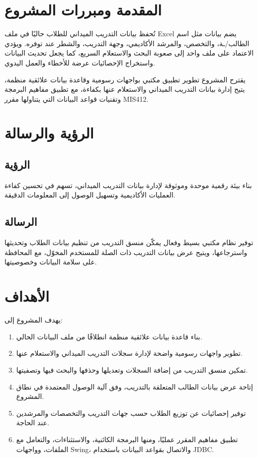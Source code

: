 \documentclass[12pt,a4paper]{article}
\begin{document}
\section{المقدمة ومبررات المشروع}
تُحفظ بيانات التدريب الميداني للطلاب حاليًا في ملف Excel يضم بيانات مثل اسم الطالب/ـة، والتخصص، والمرشد الأكاديمي، وجهة التدريب، والشطر عند توفره. ويؤدي الاعتماد على ملف واحد إلى صعوبة البحث والاستعلام السريع، كما يجعل تحديث البيانات واستخراج الإحصائيات عرضة للأخطاء والعمل اليدوي.

يقترح المشروع تطوير تطبيق مكتبي بواجهات رسومية وقاعدة بيانات علائقية منظمة، يتيح إدارة بيانات التدريب الميداني والاستعلام عنها بكفاءة، مع تطبيق مفاهيم البرمجة وتقنيات قواعد البيانات التي يتناولها مقرر MIS412.

\section{الرؤية والرسالة}
\subsection{الرؤية}
بناء بيئة رقمية موحدة وموثوقة لإدارة بيانات التدريب الميداني، تسهم في تحسين كفاءة العمليات الأكاديمية وتسهيل الوصول إلى المعلومات الدقيقة.

\subsection{الرسالة}
توفير نظام مكتبي بسيط وفعال يمكّن منسق التدريب من تنظيم بيانات الطلاب وتحديثها واسترجاعها، ويتيح عرض بيانات التدريب ذات الصلة للمستخدم المخوّل، مع المحافظة على سلامة البيانات وخصوصيتها.

\section{الأهداف}
يهدف المشروع إلى:
\begin{enumerate}
\item بناء قاعدة بيانات علائقية منظمة انطلاقًا من ملف البيانات الحالي.
\item تطوير واجهات رسومية واضحة لإدارة سجلات التدريب الميداني والاستعلام عنها.
\item تمكين منسق التدريب من إضافة السجلات وتعديلها وحذفها والبحث فيها وتصفيتها.
\item إتاحة عرض بيانات الطالب المتعلقة بالتدريب، وفق آلية الوصول المعتمدة في نطاق المشروع.
\item توفير إحصائيات عن توزيع الطلاب حسب جهات التدريب والتخصصات والمرشدين عند الحاجة.
\item تطبيق مفاهيم المقرر عمليًا، ومنها البرمجة الكائنية، والاستثناءات، والتعامل مع الملفات، وواجهات Swing، والاتصال بقواعد البيانات باستخدام JDBC.
\end{enumerate}
\end{document}
